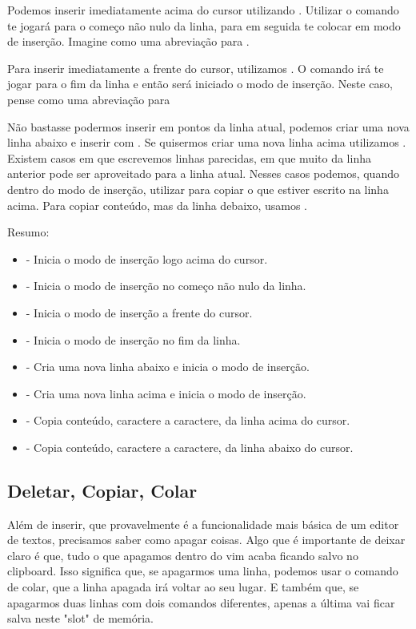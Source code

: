 Podemos inserir imediatamente acima do cursor utilizando .
Utilizar o comando  te jogará para o começo não nulo da linha,
para em seguida te colocar em modo de inserção.
Imagine como uma abreviação para \vimcommand{\^}.

Para inserir imediatamente a frente do cursor, utilizamos .
O comando  irá te jogar para o fim da linha e então será iniciado o modo de inserção.
Neste caso, pense como uma abreviação para 

Não bastasse podermos inserir em pontos da linha atual, podemos criar uma nova linha abaixo e inserir com .
Se quisermos criar uma nova linha acima utilizamos .
Existem casos em que escrevemos linhas parecidas, em que muito da linha anterior pode ser aproveitado para a linha atual.
Nesses casos podemos, quando dentro do modo de inserção, utilizar  para copiar o que estiver escrito
na linha acima. Para copiar conteúdo, mas da linha debaixo, usamos .

Resumo:
\begin{itemize}
    \item {} - Inicia o modo de inserção logo acima do cursor.
    \item {} - Inicia o modo de inserção no começo não nulo da linha.
    \item {} - Inicia o modo de inserção a frente do cursor.
    \item {} - Inicia o modo de inserção no fim da linha.
    \item {} - Cria uma nova linha abaixo e inicia o modo de inserção.
    \item {} - Cria uma nova linha acima e inicia o modo de inserção.
    \item {} - Copia conteúdo, caractere a caractere, da linha acima do cursor.
    \item {} - Copia conteúdo, caractere a caractere, da linha abaixo do cursor.
\end{itemize}

\subsection{Deletar, Copiar, Colar}
Além de inserir, que provavelmente é a funcionalidade mais básica de um editor de textos, precisamos saber como apagar coisas.
Algo que é importante de deixar claro é que, tudo o que apagamos dentro do vim acaba ficando salvo no clipboard.
Isso significa que, se apagarmos uma linha, podemos usar o comando de colar, que a linha apagada irá voltar ao seu lugar.
E também que, se apagarmos duas linhas com dois comandos diferentes, apenas a última vai ficar salva neste "slot" de memória.

